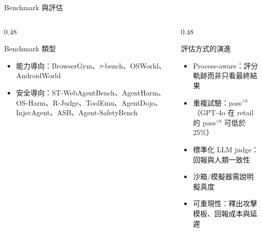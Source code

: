\documentclass[aspectratio=169]{beamer}
\begin{document}
\begin{frame}{Benchmark 與評估}
    \footnotesize
    \begin{columns}[T]
        \begin{column}{0.48\textwidth}
            \begin{block}{Benchmark 類型}
                \begin{itemize}
                    \item 能力導向：BrowserGym、$\tau$-bench、OSWorld、AndroidWorld
                    \item 安全導向：ST-WebAgentBench、AgentHarm、OS-Harm、R-Judge、ToolEmu、AgentDojo、InjecAgent、ASB、\alert{Agent-SafetyBench}
                \end{itemize}
            \end{block}
        \end{column}
        \begin{column}{0.48\textwidth}
            \begin{block}{評估方式的演進}
                \begin{itemize}
                    \item Process-aware：評分軌跡而非只看最終結果
                    \item 重複試驗：pass$^{\wedge k}$（GPT-4o 在 retail 的 pass$^{\wedge 8}$ 可低於 25\%）
                    \item 標準化 LLM judge：回報與人類一致性
                    \item 沙箱/模擬器需說明擬真度
                    \item 可重現性：釋出攻擊模板、回報成本與延遲
                \end{itemize}
            \end{block}
        \end{column}
    \end{columns}
\end{frame}
\end{document}
